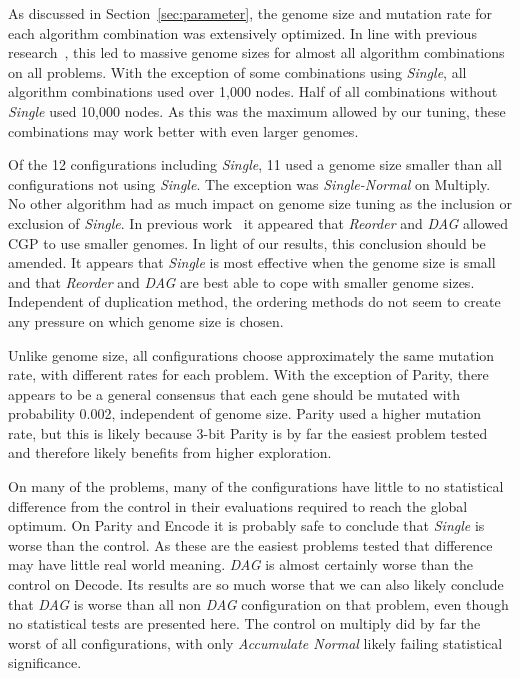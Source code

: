 \documentclass[journal]{IEEEtran}
\begin{document}
As discussed in Section~\ref{sec:parameter}, the genome size and mutation rate
for each algorithm combination was extensively optimized.  In line with previous
research~\cite{miller:2006:redundancy}, this led to massive genome sizes for
almost all algorithm combinations on all problems.  With the exception of 
some combinations using \emph{Single}, all algorithm combinations used over
1,000 nodes.  Half of all combinations without \emph{Single} used 10,000 nodes.
As this was the maximum allowed by our tuning, these combinations may work better with even larger
genomes.

Of the 12 configurations including \emph{Single}, 11 used a genome size smaller
than all configurations not using \emph{Single}.  The exception was \emph{Single-Normal}
on Multiply.  No other algorithm had as much impact on genome size tuning as
the inclusion or exclusion of \emph{Single}.  In previous work~\cite{goldman:2013:ordering}
it appeared that \emph{Reorder} and \emph{DAG} allowed CGP to use smaller genomes.
In light of our results, this conclusion should be amended.
It appears that \emph{Single} is most effective when the genome size is small and
that \emph{Reorder} and \emph{DAG} are best able to cope with smaller genome sizes.
Independent of duplication method, the ordering methods do not seem to create any
pressure on which genome size is chosen.

Unlike genome size, all configurations choose approximately the same mutation rate,
with different rates for each problem.  With the exception of Parity, there appears
to be a general consensus that each gene should be mutated with probability 0.002,
independent of genome size.  Parity used a higher mutation rate, but this is likely
because 3-bit Parity is by far the easiest problem tested and therefore likely benefits
from higher exploration.

On many of the problems, many of the configurations have little to no statistical
difference from the control in their evaluations required to reach the global optimum.
On Parity and Encode it is probably safe to conclude that \emph{Single} is worse than
the control.  As these are the easiest problems tested that difference may have
little real world meaning.  \emph{DAG} is almost certainly worse than the control on
Decode.  Its results are so much worse that we can also likely conclude that \emph{DAG}
is worse than all non \emph{DAG} configuration on that problem, even though no statistical
tests are presented here.  The control on multiply did by far the worst of all configurations,
with only \emph{Accumulate Normal} likely failing statistical significance.
\end{document}
